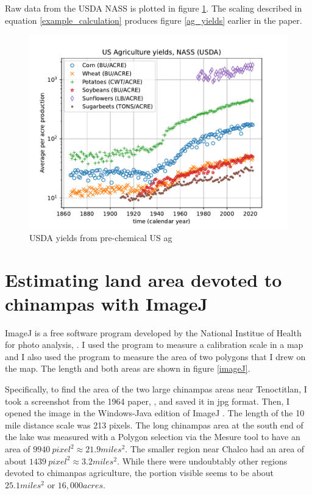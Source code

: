 \documentclass[12pt]{iopart}
\begin{document}
Raw data from the USDA NASS is plotted in figure \ref{raw_production_per_acre}.  The scaling described in equation \ref{example_calculation} produces figure \ref{ag_yields} earlier in the paper.
\begin{figure}[ht!]
\centering
\includegraphics[width=\columnwidth]{raw_production_per_acre.pdf}
\caption{
USDA yields from pre-chemical US ag
}
\label{raw_production_per_acre}
\end{figure}


\section{Estimating land area devoted to chinampas with ImageJ}
\label{appx_imageJ}

ImageJ is a free software program developed by the National Institue of Health for photo analysis, \cite{imageJ}.  I used the program to measure a calibration scale in a map and I also used the program to measure the area of two polygons that I drew on the map.  The length and both areas are shown in figure \ref{imageJ}.

Specifically, to find the area of the two large chinampas areas near Tenoctitlan, I took a screenshot from the 1964 paper, \cite{Chinampas_1964}, and saved it in jpg format.  Then, I opened the image in the Windows-Java edition of ImageJ \cite{imageJ}.  The length of the 10 mile distance scale was 213 pixels. The long chinampas area at the south end of the lake was measured with a Polygon selection via the Mesure tool to have an area of $9940~pixel^2\approx21.9miles^2$.  The smaller region near Chalco had an area of about $1439~pixel^2\approx3.2miles^2$.  While there were undoubtably other regions devoted to chimanpas agriculture, the portion visible seems to be about $25.1miles^2$ or $16,000acres$.  
\end{document}
